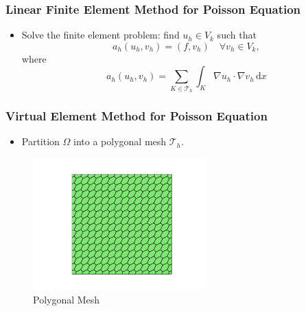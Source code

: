\documentclass[notheorems,serif]{beamer}
\begin{document}
\begin{CJK}{UTF8}{gkai}
\begin{frame}
\frametitle{Linear Finite Element Method for Poisson Equation}
\begin{itemize}
\item Solve the finite element problem: find $u_h \in V_k$ such that
    $$
    a_h(u_h, v_h) = (f, v_h) \quad \forall v_h \in V_k,
    $$
    where
    $$
    a_h(u_h, v_h) = \sum_{K \in \mathcal{T}_h} \int_K \nabla u_h \cdot \nabla v_h \,
    \mathrm{d} x
    $$
\end{itemize}
\end{frame}

\begin{frame}
    \frametitle{Virtual Element Method for Poisson Equation}
\begin{itemize}
    \item Partition $\Omega$ into a polygonal mesh $\mathcal{T}_h$. 
\end{itemize}
\begin{figure}[htpb]
    \centering
    \includegraphics[width=0.6\textwidth]{../figures/convex.pdf}
    \caption{Polygonal Mesh}
\end{figure}
\end{frame}


\end{CJK}
\end{document}
